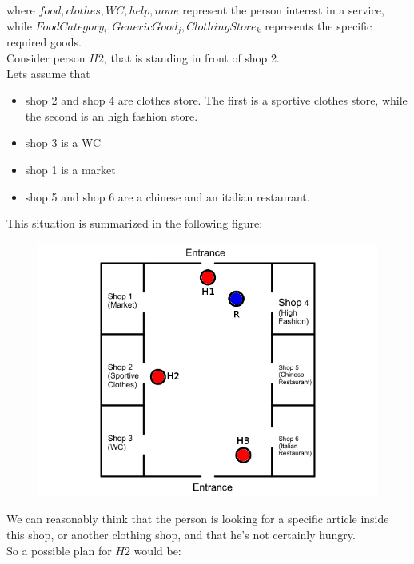 \documentclass[pdftex,12pt,a4paper]{report}
\begin{document}
\noindent where $food, clothes, WC, help, none$ represent the person interest in a service, while $FoodCategory_i, GenericGood_j, ClothingStore_k$ represents the specific required goods.\\
Consider person $H2$, that is standing in front of shop 2. \\
Lets assume that 
\begin{itemize}
\item shop 2 and shop 4 are clothes store. The first is a sportive clothes store, while the second is an high fashion store.
\item shop 3 is a WC
\item shop 1 is a market
\item shop 5 and shop 6 are a chinese and an italian restaurant.
\end{itemize}
This situation is summarized in the following figure:
\begin{figure}[H]
	\centering
	\includegraphics[scale=0.5]{images/mall_situation2.png}
	\caption{}
	\label{fig:mall_2}
\end{figure} 
\noindent We can reasonably think that the person is looking for a specific article inside this shop, or another clothing shop, and that he's not certainly hungry. \\
So a possible plan for $H2$ would be:
\end{document}
